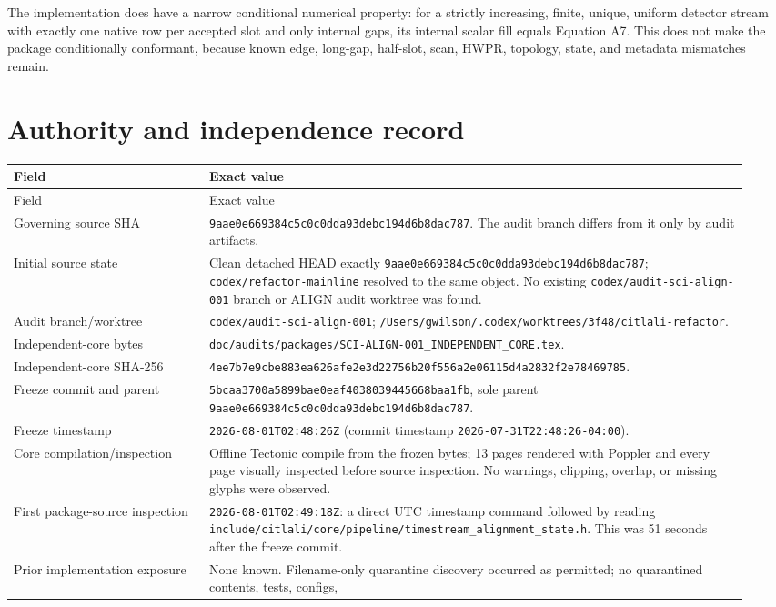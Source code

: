 \documentclass[11pt]{article}
\newcommand{\code}[1]{\nolinkurl{#1}}
\newcommand{\Aeq}[1]{Equation A#1}
\newcommand{\AuditGoverningSHAPrint}{\code{9aae0e669384c5c0c0dd}\allowbreak\code{a93debc194d6b8dac787}}
\newcommand{\AuditBranch}{codex/audit-sci-align-001}
\newcommand{\AuditWorktree}{/Users/gwilson/.codex/worktrees/3f48/citlali-refactor}
\newcommand{\AuditCorePath}{doc/audits/packages/SCI-ALIGN-001_INDEPENDENT_CORE.tex}
\newcommand{\AuditCoreSHAPrint}{\code{4ee7b7e9cbe883ea626afe2e3d22756b}\allowbreak\code{20f556a2e06115d4a2832f2e78469785}}
\newcommand{\AuditCoreFreezeCommit}{5bcaa3700a5899bae0eaf4038039445668baa1fb}
\begin{document}
The implementation does have a narrow conditional numerical property: for a
strictly increasing, finite, unique, uniform detector stream with exactly one
native row per accepted slot and only internal gaps, its internal scalar fill
equals \Aeq{7}.  This does not make the package conditionally conformant,
because known edge, long-gap, half-slot, scan, HWPR, topology, state, and
metadata mismatches remain.

\section{Authority and independence record}

\begin{longtable}{L{0.25\linewidth}L{0.69\linewidth}}
\toprule
Field & Exact value\\
\midrule
\endfirsthead
\toprule
Field & Exact value\\
\midrule
\endhead
Governing source SHA & \AuditGoverningSHAPrint.  The audit branch differs
from it only by audit artifacts.\\
Initial source state & Clean detached HEAD exactly
\code{9aae0e669384c5c0c0dda93debc194d6b8dac787};
\code{codex/refactor-mainline} resolved to the same object.  No existing
\code{codex/audit-sci-align-001} branch or ALIGN audit worktree was found.\\
Audit branch/worktree & \code{\AuditBranch}; \code{\AuditWorktree}.\\
Independent-core bytes & \code{\AuditCorePath}.\\
Independent-core SHA-256 & \AuditCoreSHAPrint.\\
Freeze commit and parent & \code{\AuditCoreFreezeCommit}, sole parent
\AuditGoverningSHAPrint.\\
Freeze timestamp & \code{2026-08-01T02:48:26Z}
(commit timestamp \code{2026-07-31T22:48:26-04:00}).\\
Core compilation/inspection & Offline Tectonic compile from the frozen bytes;
13 pages rendered with Poppler and every page visually inspected before source
inspection.  No warnings, clipping, overlap, or missing glyphs were observed.\\
First package-source inspection & \code{2026-08-01T02:49:18Z}: a direct UTC
timestamp command followed by reading
\code{include/citlali/core/pipeline/timestream_alignment_state.h}.  This was
51 seconds after the freeze commit.\\
Prior implementation exposure & None known.  Filename-only quarantine
discovery occurred as permitted; no quarantined contents, tests, configs,

\end{longtable}
\end{document}
